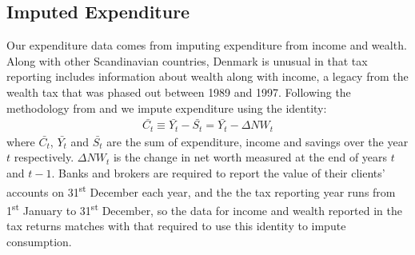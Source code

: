 \documentclass[titlepage]{\econtex}\newcommand{\texname}{IncomeUncertainty}
\begin{document}
\subsection{Imputed Expenditure} \label{cons_imputation}
Our expenditure data comes from imputing expenditure from income and wealth. Along with other Scandinavian countries, Denmark is unusual in that tax reporting includes information about wealth along with income, a legacy from the wealth tax that was phased out between 1989 and 1997. Following the methodology from \cite{browning_imputing_2003} and \cite{fagereng_imputing_2015} we impute expenditure using the identity:
		\begin{align*}
	\bar{C_t} \equiv \bar{Y_t} - \bar{S_t} = \bar{Y_t} - \Delta NW_t
	\end{align*}
where $\bar{C_t}$, $\bar{Y_t}$ and $\bar{S_t}$  are the sum of expenditure, income and savings over the year $t$ respectively. $\Delta NW_t$ is the change in net worth measured at the end of years $t$ and $t-1$. Banks and brokers are required to report the value of their clients' accounts on 31\textsuperscript{st} December each year, and the the tax reporting year runs from 1\textsuperscript{st} January to 31\textsuperscript{st} December, so the data for income and wealth reported in the tax returns matches with that required to use this identity to impute consumption.
\end{document}
